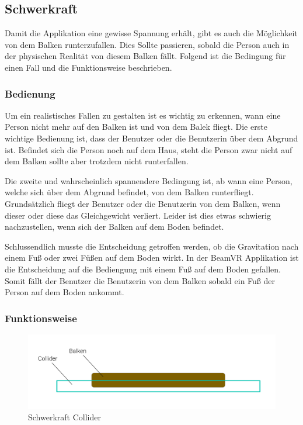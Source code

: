 \subsection{Schwerkraft}
\label{subsec:gravity}

Damit die Applikation eine gewisse Spannung erhält, gibt es auch die Möglichkeit von dem Balken runterzufallen.
Dies Sollte passieren, sobald die Person auch in der physischen Realität von diesem Balken fällt.
Folgend ist die Bedingung für einen Fall und die Funktionsweise beschrieben.

\subsubsection{Bedienung}

Um ein realistisches Fallen zu gestalten ist es wichtig zu erkennen, wann eine Person nicht mehr auf den Balken ist und von dem Balek fliegt.
Die erste wichtige Bedienung ist, dass der Benutzer oder die Benutzerin über dem Abgrund ist.
Befindet sich die Person noch auf dem Haus, steht die Person zwar nicht auf dem Balken sollte aber trotzdem nicht runterfallen.

Die zweite und wahrscheinlich spannendere Bedingung ist, ab wann eine Person, welche sich über dem Abgrund befindet, von dem Balken runterfliegt.
Grundsätzlich fliegt der Benutzer oder die Benutzerin von dem Balken, wenn dieser oder diese das Gleichgewicht verliert.
Leider ist dies etwas schwierig nachzustellen, wenn sich der Balken auf dem Boden befindet.

Schlussendlich musste die Entscheidung getroffen werden, ob die Gravitation nach einem Fuß oder zwei Füßen auf dem Boden wirkt.
In der BeamVR Applikation ist die Entscheidung auf die Bediengung mit einem Fuß auf dem Boden gefallen.
Somit fällt der Benutzer die Benutzerin von dem Balken sobald ein Fuß der Person auf dem Boden ankommt.

\subsubsection{Funktionsweise}

\begin{figure}
    \centering
    \includegraphics[scale=0.2]{pics/gravitation_collider}
    \caption{Schwerkraft Collider}
    \label{fig:gravitation-collider}
\end{figure}



